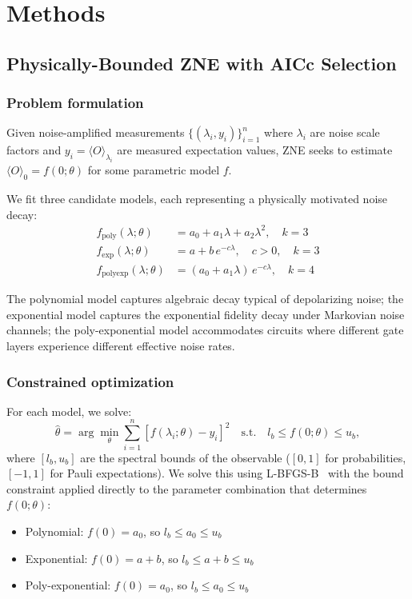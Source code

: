 \section{Methods}
\label{sec:methods}

\subsection{Physically-Bounded ZNE with AICc Selection}
\label{sec:bounded_zne}

\subsubsection{Problem formulation}

Given noise-amplified measurements $\{(\lambda_i, y_i)\}_{i=1}^n$ where $\lambda_i$ are noise scale factors and $y_i = \langle O \rangle_{\lambda_i}$ are measured expectation values, ZNE seeks to estimate $\langle O \rangle_0 = f(0;\theta)$ for some parametric model $f$.

We fit three candidate models, each representing a physically motivated noise decay:
\begin{align}
    f_\text{poly}(\lambda;\theta) &= a_0 + a_1\lambda + a_2\lambda^2, \quad k=3 \label{eq:poly} \\
    f_\text{exp}(\lambda;\theta) &= a + b\,e^{-c\lambda}, \quad c > 0, \quad k=3 \label{eq:exp} \\
    f_\text{polyexp}(\lambda;\theta) &= (a_0 + a_1\lambda)\,e^{-c\lambda}, \quad k=4 \label{eq:polyexp}
\end{align}

The polynomial model captures algebraic decay typical of depolarizing noise; the exponential model captures the exponential fidelity decay under Markovian noise channels; the poly-exponential model accommodates circuits where different gate layers experience different effective noise rates.

\subsubsection{Constrained optimization}

For each model, we solve:
\begin{equation}
    \hat{\theta} = \arg\min_\theta \sum_{i=1}^{n} \left[ f(\lambda_i; \theta) - y_i \right]^2 \quad \text{s.t.} \quad l_b \leq f(0; \theta) \leq u_b,
    \label{eq:bounded_opt}
\end{equation}
where $[l_b, u_b]$ are the spectral bounds of the observable ($[0,1]$ for probabilities, $[-1,1]$ for Pauli expectations). We solve this using L-BFGS-B~\cite{Byrd1995} with the bound constraint applied directly to the parameter combination that determines $f(0;\theta)$:
\begin{itemize}
    \item Polynomial: $f(0) = a_0$, so $l_b \leq a_0 \leq u_b$
    \item Exponential: $f(0) = a + b$, so $l_b \leq a + b \leq u_b$
    \item Poly-exponential: $f(0) = a_0$, so $l_b \leq a_0 \leq u_b$
\end{itemize}

